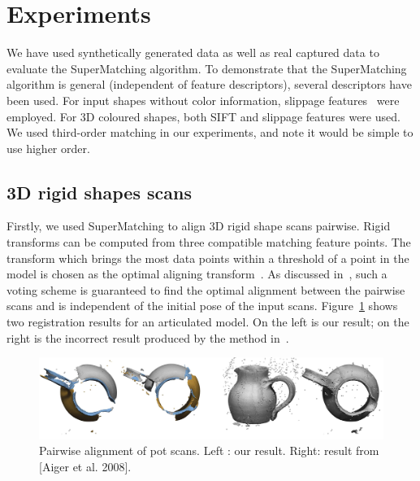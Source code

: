 \section{Experiments}
\label{sec:experiments}

We have used synthetically generated data as well as real captured data to evaluate the SuperMatching algorithm.
To demonstrate that the SuperMatching algorithm is general (independent of feature descriptors), several descriptors have been used.
For  input shapes without color information, slippage features~\cite{Bokeloh08} were employed.
For 3D coloured shapes, both SIFT and slippage features were used.
We used third-order matching in our experiments, and note it would be simple to use higher order.

\subsection{3D rigid shapes scans}
\label{subsec:3DRigid}

Firstly, we used SuperMatching to align 3D rigid shape scans pairwise.
Rigid transforms can be computed from three compatible matching feature points.
The transform which brings the most data points within a threshold of a point in the model is chosen as the optimal aligning transform~\cite{Huttenlocher90}.
As discussed in~\cite{Gelfand05}, such a voting scheme is guaranteed to find the optimal alignment between the pairwise scans and is independent of the initial pose of the input scans.
Figure~\ref{fig:3DPair} shows two registration results for  an articulated model. On the left is our result; on the right is the incorrect result produced by the method in~\cite{Aiger08}.

\begin{figure}[t!]
\centering
  \includegraphics[width=0.99\linewidth]{figures/rigidCMP.jpg}
  \caption{Pairwise alignment of pot scans. Left : our result. Right: result from [Aiger et al. 2008].}
\label{fig:3DPair}
\end{figure}

